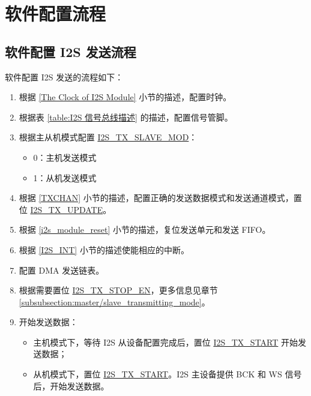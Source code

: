 \documentclass[main\_\_CN.tex]{subfiles}
\begin{document}
\section{软件配置流程}
\subsection{软件配置 I2S 发送流程}\label{sec:configure-i2s-as-tx-mode}
软件配置 I2S 发送的流程如下：

\begin{enumerate}
    \item 根据 \ref{The Clock of I2S Module} 小节的描述，配置时钟。

    \item 根据表 \ref{table:I2S 信号总线描述} 的描述，配置信号管脚。

    \item 根据主从机模式配置 \hyperref[fielddesc:I2STXSLAVEMOD]{I2S\_TX\_SLAVE\_MOD}：
    \begin{itemize}
        \item 0：主机发送模式
        \item 1：从机发送模式
    \end{itemize}

    \item 根据 \ref{TXCHAN} 小节的描述，配置正确的发送数据模式和发送通道模式，置位 \hyperref[fielddesc:I2STXUPDATE]{I2S\_TX\_UPDATE}。

    \item 根据 \ref{i2s_module_reset} 小节的描述，复位发送单元和发送 FIFO。
    \item 根据 \ref{I2S_INT} 小节的描述使能相应的中断。\label{I2S-TX-INTERRUPT}

    \item 配置 DMA 发送链表。

    \item 根据需要置位 \hyperref[fielddesc:I2STXSTOPEN]{I2S\_TX\_STOP\_EN}，更多信息见章节 \ref{subsubsection:master/slave_transmitting_mode}。

    \item 开始发送数据：
    \begin{itemize}
        \item 主机模式下，等待 I2S 从设备配置完成后，置位 \hyperref[fielddesc:I2STXSTART]{I2S\_TX\_START} 开始发送数据；
        \item 从机模式下，置位 \hyperref[fielddesc:I2STXSTART]{I2S\_TX\_START}。I2S 主设备提供 BCK 和 WS 信号后，开始发送数据。
    \end{itemize}


\end{enumerate}
\end{document}
